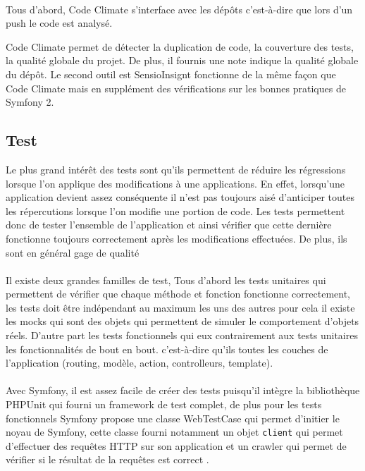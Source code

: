 \paragraph{}
Tous d'abord, Code Climate s'interface avec les dépôts c'est-à-dire que lors d'un push le code est analysé.

Code Climate permet de détecter la duplication de code, la couverture des tests, la qualité globale du projet. De plus, il fournis une note indique la qualité globale du dépôt. 
Le second outil est SensioInsignt fonctionne de la même façon que Code Climate mais en supplément des vérifications sur les bonnes pratiques de Symfony 2.
\subsection{Test}
Le plus grand intérêt des tests sont qu'ils permettent de réduire les régressions lorsque l'on applique des modifications à une applications. En effet, lorsqu'une application devient assez conséquente il n'est pas toujours aisé d'anticiper toutes les répercutions lorsque l'on modifie une portion de code. Les tests permettent donc de tester l'ensemble de l'application et ainsi vérifier que cette dernière fonctionne toujours correctement après les modifications effectuées. 
De plus, ils sont en général gage de qualité
 \paragraph{}
 Il existe deux grandes familles de test, Tous d'abord les tests unitaires qui permettent de vérifier que chaque méthode et fonction fonctionne correctement, les tests doit être indépendant au maximum les uns des autres pour cela il existe les mocks qui sont des objets qui permettent de simuler le comportement d'objets \og{}réels\fg{}.
 D'autre part les tests fonctionnels qui eux contrairement aux tests unitaires les fonctionnalités de bout en bout. c'est-à-dire qu'ils toutes les couches de l'application (routing, modèle, action, controlleurs, template).
  \paragraph{}
 Avec Symfony, il est assez facile de créer des tests puisqu'il intègre la bibliothèque PHPUnit qui fourni un framework de test complet, de plus pour les tests fonctionnels Symfony propose une classe WebTestCase qui permet d'initier le noyau de Symfony, cette classe fourni notamment un objet \verb?client? qui permet d'effectuer des requêtes HTTP sur son application et un crawler qui permet de vérifier si le résultat de la requêtes est correct .
